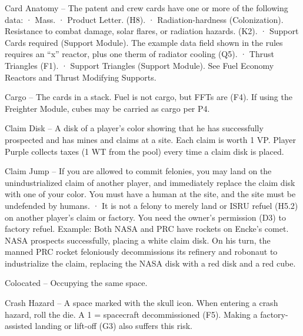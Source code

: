 \documentclass[a4paper]{book}
\begin{document}
Card Anatomy – The patent and crew cards have one or more of the following data:
·       Mass.
·       Product Letter. (H8).
·       Radiation-hardness (Colonization). Resistance to combat damage, solar flares, or radiation hazards. (K2).
·       Support Cards required (Support Module). The example data field shown in the rules requires an “x” reactor, plus one therm of radiator cooling (Q5).
·       Thrust Triangles (F1).
·       Support Triangles (Support Module). See Fuel Economy Reactors and Thrust Modifying Supports.

 Cargo – The cards in a stack. Fuel is not cargo, but FFTs are (F4). If using the Freighter Module, cubes may be carried as cargo per P4.

Claim Disk – A disk of a player’s color showing that he has successfully prospected and has mines and claims at a site. Each claim is worth 1 VP. Player Purple collects taxes (1 WT from the pool) every time a claim disk is placed.

Claim Jump – If you are allowed to commit felonies, you may land on the unindustrialized claim of another player, and immediately replace the claim disk with one of your color. You must have a human at the site, and the site must be undefended by humans.
·       It is not a felony to merely land or ISRU refuel (H5.2) on another player’s claim or factory. You need the owner’s permission (D3) to factory refuel.
Example: Both NASA and PRC have rockets on Encke’s comet. NASA prospects successfully, placing a white claim disk. On his turn, the manned PRC rocket feloniously decommissions its refinery and robonaut to industrialize the claim, replacing the NASA disk with a red disk and a red cube.

Colocated – Occupying the same space.

Crash Hazard – A space marked with the skull icon. When entering a crash hazard, roll the die. A 1 = spacecraft decommissioned (F5). Making a factory-assisted landing or lift-off (G3) also suffers this risk.
\end{document}
